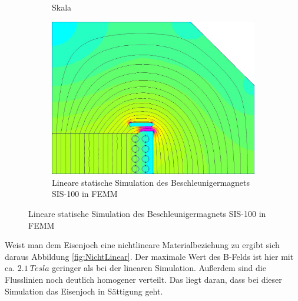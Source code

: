 \begin{figure}[h!]
\begin{subfigure}[h]{.28\textwidth}
		\caption{Skala}
		\label{fig:SkalaLin}
	\end{subfigure}
	\begin{subfigure}[h]{.60\textwidth}
		\centering
		\includegraphics[width=\textwidth]{data/Linear}
		\caption{Lineare statische Simulation des Beschleunigermagnets SIS-100 in FEMM}
		\label{fig:Linear}
	\end{subfigure}	
\end{figure}

Weist man dem Eisenjoch eine nichtlineare Materialbeziehung zu ergibt sich daraus Abbildung \ref{fig:NichtLinear}. Der maximale Wert des B-Felds ist hier mit ca. $\SI{2,1}{Tesla}$ geringer als bei der linearen Simulation. Außerdem sind die Flusslinien noch deutlich homogener verteilt. Das liegt daran, dass bei dieser Simulation das Eisenjoch in Sättigung geht.

